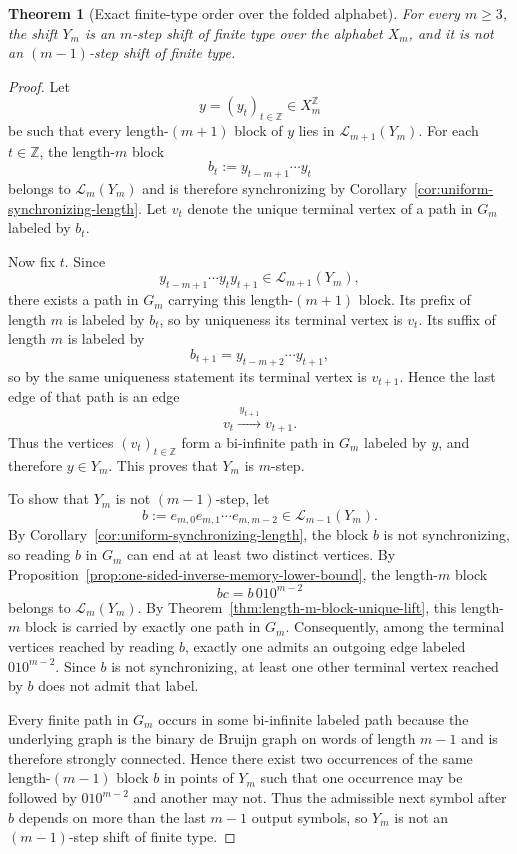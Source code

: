 \documentclass[11pt,letterpaper]{article}
\numberwithin{equation}{section}
\theoremstyle{plain}
\newtheorem{theorem}{Theorem}[section]
\theoremstyle{definition}
\theoremstyle{remark}
\newcommand{\ZZ}{\mathbb{Z}}
\begin{document}
\begin{theorem}[Exact finite-type order over the folded alphabet]
\label{thm:Y-m-exact-SFT-order}
For every $m\ge 3$, the shift $Y_m$ is an $m$-step shift of finite type over
the alphabet $X_m$, and it is not an $(m-1)$-step shift of finite type.
\end{theorem}

\begin{proof}
Let
\[
y=(y_t)_{t\in\ZZ}\in X_m^{\ZZ}
\]
be such that every length-$(m+1)$ block of $y$ lies in
$\mathcal L_{m+1}(Y_m)$.  For each $t\in\ZZ$, the length-$m$ block
\[
b_t:=y_{t-m+1}\cdots y_t
\]
belongs to $\mathcal L_m(Y_m)$ and is therefore synchronizing by
Corollary~\ref{cor:uniform-synchronizing-length}.  Let $v_t$ denote the unique
terminal vertex of a path in $G_m$ labeled by $b_t$.

Now fix $t$.  Since
\[
y_{t-m+1}\cdots y_ty_{t+1}\in\mathcal L_{m+1}(Y_m),
\]
there exists a path in $G_m$ carrying this length-$(m+1)$ block.  Its prefix
of length $m$ is labeled by $b_t$, so by uniqueness its terminal vertex is
$v_t$.  Its suffix of length $m$ is labeled by
\[
b_{t+1}=y_{t-m+2}\cdots y_{t+1},
\]
so by the same uniqueness statement its terminal vertex is $v_{t+1}$.  Hence
the last edge of that path is an edge
\[
v_t\xrightarrow{\,y_{t+1}\,}v_{t+1}.
\]
Thus the vertices $(v_t)_{t\in\ZZ}$ form a bi-infinite path in $G_m$ labeled by
$y$, and therefore $y\in Y_m$.  This proves that $Y_m$ is $m$-step.

To show that $Y_m$ is not $(m-1)$-step, let
\[
b:=e_{m,0}e_{m,1}\cdots e_{m,m-2}\in\mathcal L_{m-1}(Y_m).
\]
By Corollary~\ref{cor:uniform-synchronizing-length}, the block $b$ is not
synchronizing, so reading $b$ in $G_m$ can end at at least two distinct
vertices.  By Proposition~\ref{prop:one-sided-inverse-memory-lower-bound}, the
length-$m$ block
\[
bc=b\,010^{m-2}
\]
belongs to $\mathcal L_m(Y_m)$.  By
Theorem~\ref{thm:length-m-block-unique-lift}, this length-$m$ block is carried
by exactly one path in $G_m$.  Consequently, among the terminal vertices
reached by reading $b$, exactly one admits an outgoing edge labeled
$010^{m-2}$.  Since $b$ is not synchronizing, at least one other terminal
vertex reached by $b$ does not admit that label.

Every finite path in $G_m$ occurs in some bi-infinite labeled path because the
underlying graph is the binary de Bruijn graph on words of length $m-1$ and is
therefore strongly connected.  Hence there exist two occurrences of the same
length-$(m-1)$ block $b$ in points of $Y_m$ such that one occurrence may be
followed by $010^{m-2}$ and another may not.  Thus the admissible next symbol
after $b$ depends on more than the last $m-1$ output symbols, so $Y_m$ is not
an $(m-1)$-step shift of finite type.
\end{proof}
\end{document}
